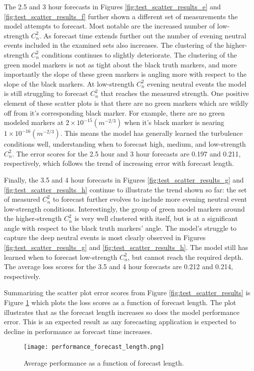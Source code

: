 The 2.5 and 3 hour forecasts in Figures \ref{fig:test_scatter_results_e} and \ref{fig:test_scatter_results_f} further shown a different set of measurements the model attempts to forecast. Most notable are the increased number of low-strength $C_{n}^{2}$. As forecast time extends further out the number of evening neutral events included in the examined sets also increases. The clustering of the higher-strength $C_{n}^{2}$ conditions continues to slightly deteriorate. The clustering of the green model markers is not as tight about the black truth markers, and more importantly the slope of these green markers is angling more with respect to the slope of the black markers. At low-strength $C_{n}^{2}$ evening neutral events the model is still struggling to forecast $C_{n}^{2}$ that reaches the measured strength. One positive element of these scatter plots is that there are no green markers which are wildly off from it's corresponding black marker. For example, there are no green modeled markers at $2 \times 10^{-15} (m^{-2/3})$ when it's black marker is nearing $1 \times 10^{-16} (m^{-2/3})$. This means the model has generally learned the turbulence conditions well, understanding when to forecast high, medium, and low-strength $C_{n}^{2}$. The error scores for the 2.5 hour and 3 hour forecasts are 0.197 and 0.211, respectively, which follows the trend of increasing error with forecast length.

Finally, the 3.5 and 4 hour forecasts in Figures \ref{fig:test_scatter_results_g} and \ref{fig:test_scatter_results_h} continue to illustrate the trend shown so far: the set of measured $C_{n}^{2}$ to forecast further evolves to include more evening neutral event low-strength conditions. Interestingly, the group of green model markers around the higher-strength $C_{n}^{2}$ is very well clustered with itself, but is at a significant angle with respect to the black truth markers' angle. The model's struggle to capture the deep neutral events is most clearly observed in Figures \ref{fig:test_scatter_results_g} and \ref{fig:test_scatter_results_h}. The model still has learned when to forecast low-strength $C_{n}^{2}$, but cannot reach the required depth. The average loss scores for the 3.5 and 4 hour forecasts are 0.212 and 0.214, respectively.


Summarizing the scatter plot error scores from Figure \ref{fig:test_scatter_results} is Figure \ref{fig:performance_forecast_length} which plots the loss scores as a function of forecast length. The plot illustrates that as the forecast length increases so does the model performance error. This is an expected result as any forecasting application is expected to decline in performance as forecast time increases.
\begin{figure}[h!]
	\centering
	\texttt{[image: performance\_forecast\_length.png]}
	\caption{Average performance as a function of forecast length.}
	\label{fig:performance_forecast_length}
\end{figure}

